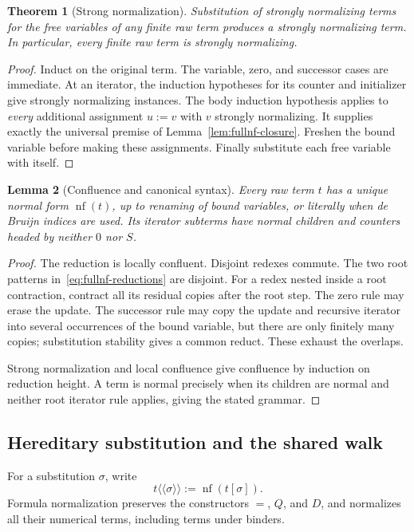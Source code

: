 \documentclass[11pt,letterpaper]{article}
\newtheorem{theorem}{Theorem}[section]
\newtheorem{lemma}[theorem]{Lemma}
\theoremstyle{definition}
\theoremstyle{remark}
\begin{document}
\begin{theorem}[Strong normalization]
\label{thm:fullnf-sn}
Substitution of strongly normalizing terms for the free variables of any
finite raw term produces a strongly normalizing term.  In particular,
every finite raw term is strongly normalizing.
\end{theorem}
\begin{proof}
Induct on the original term.  The variable, zero, and successor cases are
immediate.  At an iterator, the induction hypotheses for its counter and
initializer give strongly normalizing instances.  The body induction
hypothesis applies to \emph{every} additional assignment $u:=v$ with $v$
strongly normalizing.  It supplies exactly the universal premise of
Lemma~\ref{lem:fullnf-closure}.  Freshen the bound variable before making
these assignments.  Finally substitute each free variable with itself.
\end{proof}

\begin{lemma}[Confluence and canonical syntax]
\label{lem:fullnf-confluence}
Every raw term $t$ has a unique normal form $\operatorname{nf}(t)$, up to
renaming of bound variables, or literally when de Bruijn indices are used.
Its iterator subterms have normal children and counters headed by neither
$0$ nor $S$.
\end{lemma}
\begin{proof}
The reduction is locally confluent.  Disjoint redexes commute.  The two
root patterns in~\eqref{eq:fullnf-reductions} are disjoint.  For a redex
nested inside a root contraction, contract all its residual copies after
the root step.  The zero rule may erase the update.  The successor rule
may copy the update and recursive iterator into several occurrences of
the bound variable, but there are only finitely many copies; substitution
stability gives a common reduct.  These exhaust the overlaps.

Strong normalization and local confluence give confluence by induction on
reduction height.  A term is normal precisely when its children are normal
and neither root iterator rule applies, giving the stated grammar.
\end{proof}

\subsection{Hereditary substitution and the shared walk}

For a substitution $\sigma$, write
\[
 t\langle\!\langle\sigma\rangle\!\rangle
       :=\operatorname{nf}(t[\sigma]).
\]
Formula normalization preserves the constructors $=$, $Q$, and $D$, and
normalizes all their numerical terms, including terms under binders.
\end{document}
